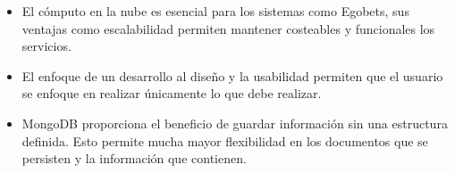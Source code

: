 \begin{itemize}
\item El cómputo en la nube es esencial para los sistemas como Egobets, sus ventajas como escalabilidad permiten mantener costeables y funcionales los servicios.

\item El enfoque de un desarrollo al diseño y la usabilidad permiten que el usuario se enfoque en realizar únicamente lo que debe realizar.

\item MongoDB proporciona el beneficio de guardar información sin una estructura definida. Esto permite mucha mayor flexibilidad en los documentos que se persisten y la información que contienen\cite{puniaimplementing}.

\end{itemize}

%
%
%
%
%
%
